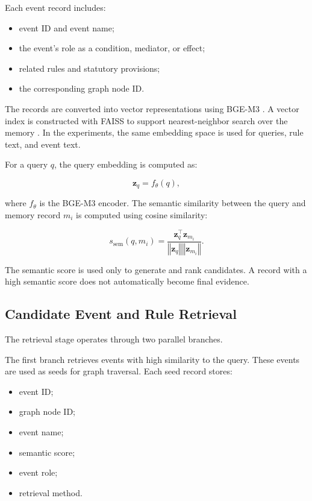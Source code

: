 Each event record includes:

\begin{itemize}
    \item event ID and event name;
    \item the event's role as a condition, mediator, or effect;
    \item related rules and statutory provisions;
    \item the corresponding graph node ID.
\end{itemize}

The records are converted into vector representations using BGE-M3
\cite{chen2024bgem3}. A vector index is constructed with FAISS to support
nearest-neighbor search over the memory \cite{johnson2019billion}. In the
experiments, the same embedding space is used for queries, rule text, and
event text.

For a query \(q\), the query embedding is computed as:

\begin{equation}
\mathbf{z}_q
=
f_{\theta}(q),
\end{equation}

where \(f_{\theta}\) is the BGE-M3 encoder. The semantic similarity between
the query and memory record \(m_i\) is computed using cosine similarity:

\begin{equation}
s_{\mathrm{sem}}
\left(
q,m_i
\right)
=
\frac{
    \mathbf{z}_q^\top \mathbf{z}_{m_i}
}{
    \left\Vert\mathbf{z}_q\right\Vert
    \left\Vert\mathbf{z}_{m_i}\right\Vert
}.
\end{equation}

The semantic score is used only to generate and rank candidates. A record
with a high semantic score does not automatically become final evidence.

\subsection{Candidate Event and Rule Retrieval}

The retrieval stage operates through two parallel branches.

The first branch retrieves events with high similarity to the query. These
events are used as seeds for graph traversal. Each seed record stores:

\begin{itemize}
    \item event ID;
    \item graph node ID;
    \item event name;
    \item semantic score;
    \item event role;
    \item retrieval method.
\end{itemize}

